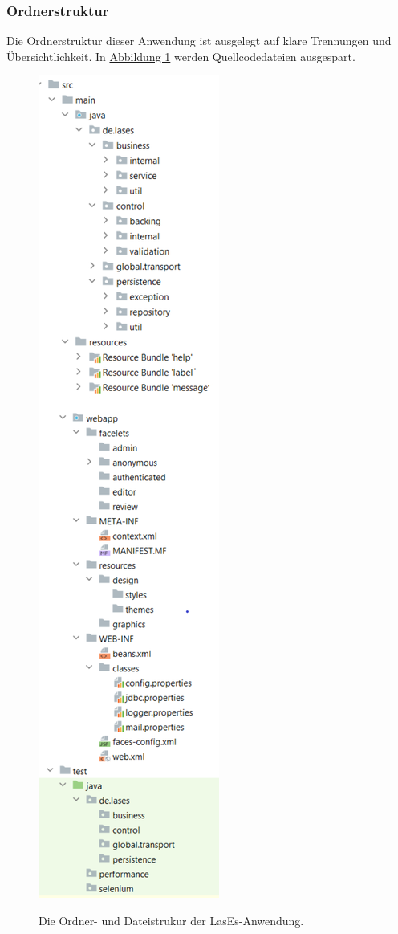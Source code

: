 \subsubsection{Ordnerstruktur}

Die Ordnerstruktur dieser Anwendung ist ausgelegt auf klare Trennungen und Übersichtlichkeit.
In \hyperref[feinarch:orddia]{Abbildung 1} werden Quellcodedateien ausgespart.

\begin{figure}[H]
    \centering
    \includegraphics[height=0.8\textheight]{graphics/folder_structure2.0}\label{feinarch:orddia}
    \caption{Die Ordner- und Dateistrukur der LasEs-Anwendung.}
\end{figure}